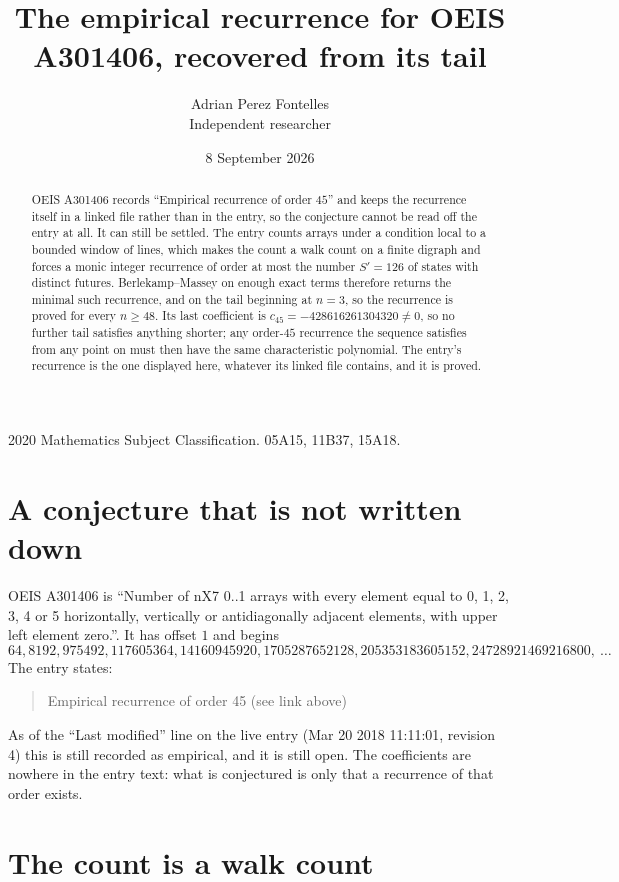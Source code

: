 \documentclass[11pt,a4paper]{article}
\title{The empirical recurrence for OEIS A301406, recovered from its tail}
\author{Adrian Perez Fontelles\\ \small Independent researcher}
\date{8 September 2026}
\theoremstyle{plain}
\theoremstyle{definition}
\begin{document}
\maketitle

\begin{abstract}
OEIS A301406 records ``Empirical recurrence of order $45$'' and keeps the recurrence itself in
a linked file rather than in the entry, so the conjecture cannot be read off the entry at all.
It can still be settled. The entry counts arrays under a condition local to a bounded window of
lines, which makes the count a walk count on a finite digraph and forces a monic integer
recurrence of order at most the number $S'=126$ of states with distinct futures. Berlekamp--Massey on
enough exact terms therefore returns the minimal such recurrence, and on the tail beginning at $n=3$, so the recurrence is proved for every $n\ge48$.
Its last coefficient is $c_{45}=-428616261304320\neq0$, so no further tail satisfies anything
shorter; any order-$45$ recurrence the sequence satisfies from any point on must then have
the same characteristic polynomial. The entry's recurrence is the one displayed here, whatever
its linked file contains, and it is proved.
\end{abstract}

\noindent\small 2020 Mathematics Subject Classification. 05A15, 11B37, 15A18.\normalsize

\section{A conjecture that is not written down}

OEIS A301406 is ``Number of nX7 0..1 arrays with every element equal to 0, 1, 2, 3, 4 or 5 horizontally, vertically or antidiagonally adjacent elements, with upper left element zero.''. It has offset $1$ and begins
\[
64, 8192, 975492, 117605364, 14160945920, 1705287652128, 205353183605152, 24728921469216800,\ \dots
\]
The entry states:
\begin{quote}
Empirical recurrence of order 45 (see link above)
\end{quote}
As of the ``Last modified'' line on the live entry (Mar 20 2018 11:11:01, revision 4)
this is still recorded as empirical, and it is still open. The coefficients are nowhere in the
entry text: what is conjectured is only that a recurrence of that order exists.

\section{The count is a walk count}
\end{document}
